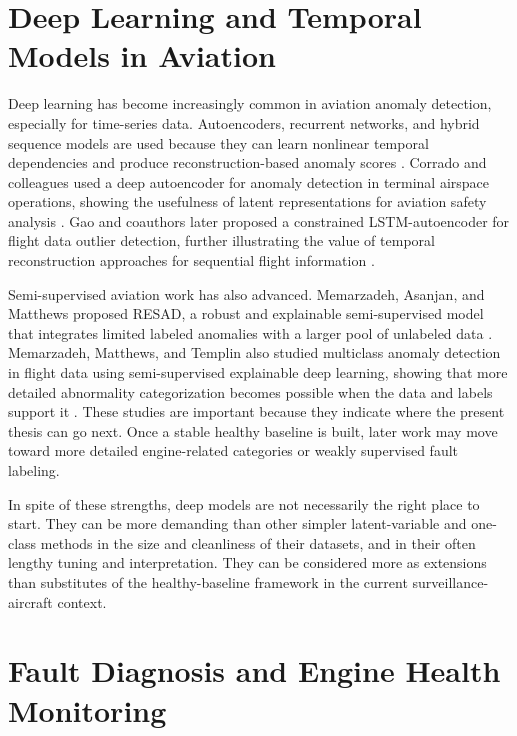 \documentclass[12pt,a4paper]{report}
\begin{document}
	\section{Deep Learning and Temporal Models in Aviation}
	
	Deep learning has become increasingly common in aviation anomaly detection, especially for time-series data. Autoencoders, recurrent networks, and hybrid sequence models are used because they can learn nonlinear temporal dependencies and produce reconstruction-based anomaly scores \cite{luo2021cpsdeep,qin2022hybrid}. Corrado and colleagues used a deep autoencoder for anomaly detection in terminal airspace operations, showing the usefulness of latent representations for aviation safety analysis \cite{corrado2021autoencoder}. Gao and coauthors later proposed a constrained LSTM-autoencoder for flight data outlier detection, further illustrating the value of temporal reconstruction approaches for sequential flight information \cite{gao2023lstm}.
	
	Semi-supervised aviation work has also advanced. Memarzadeh, Asanjan, and Matthews proposed RESAD, a robust and explainable semi-supervised model that integrates limited labeled anomalies with a larger pool of unlabeled data \cite{memarzadeh2022resad}. Memarzadeh, Matthews, and Templin also studied multiclass anomaly detection in flight data using semi-supervised explainable deep learning, showing that more detailed abnormality categorization becomes possible when the data and labels support it \cite{memarzadeh2022multiclass}. These studies are important because they indicate where the present thesis can go next. Once a stable healthy baseline is built, later work may move toward more detailed engine-related categories or weakly supervised fault labeling.
	
	In spite of these strengths, deep models are not necessarily the right place to start. They can be more demanding than other simpler latent-variable and one-class methods in the size and cleanliness of their datasets, and in their often lengthy tuning and interpretation. They can be considered more as extensions than substitutes of the healthy-baseline framework in the current surveillance-aircraft context.
	
	\section{Fault Diagnosis and Engine Health Monitoring}
	
\end{document}
